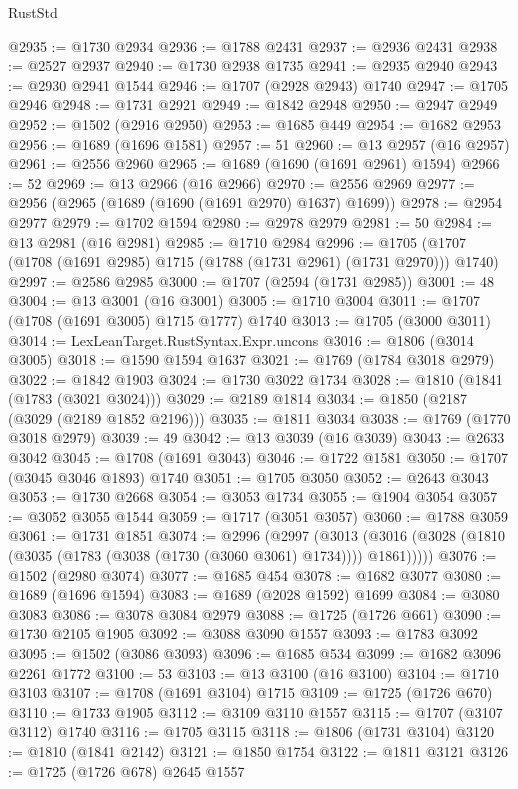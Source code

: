 \begin{lexlean}{RustStd}
\begin{coremodule}
@2935 := @1730 @2934
@2936 := @1788 @2431
@2937 := @2936 @2431
@2938 := @2527 @2937
@2940 := @1730 @2938 @1735
@2941 := @2935 @2940
@2943 := @2930 @2941 @1544
@2946 := @1707 (@2928 @2943) @1740
@2947 := @1705 @2946
@2948 := @1731 @2921
@2949 := @1842 @2948
@2950 := @2947 @2949
@2952 := @1502 (@2916 @2950)
@2953 := @1685 @449
@2954 := @1682 @2953
@2956 := @1689 (@1696 @1581)
@2957 := 51
@2960 := @13 @2957 (@16 @2957)
@2961 := @2556 @2960
@2965 := @1689 (@1690 (@1691 @2961) @1594)
@2966 := 52
@2969 := @13 @2966 (@16 @2966)
@2970 := @2556 @2969
@2977 := @2956 (@2965 (@1689 (@1690 (@1691 @2970) @1637) @1699))
@2978 := @2954 @2977
@2979 := @1702 @1594
@2980 := @2978 @2979
@2981 := 50
@2984 := @13 @2981 (@16 @2981)
@2985 := @1710 @2984
@2996 := @1705 (@1707 (@1708 (@1691 @2985) @1715 (@1788 (@1731 @2961) (@1731 @2970))) @1740)
@2997 := @2586 @2985
@3000 := @1707 (@2594 (@1731 @2985))
@3001 := 48
@3004 := @13 @3001 (@16 @3001)
@3005 := @1710 @3004
@3011 := @1707 (@1708 (@1691 @3005) @1715 @1777) @1740
@3013 := @1705 (@3000 @3011)
@3014 := LexLeanTarget.RustSyntax.Expr.uncons
@3016 := @1806 (@3014 @3005)
@3018 := @1590 @1594 @1637
@3021 := @1769 (@1784 @3018 @2979)
@3022 := @1842 @1903
@3024 := @1730 @3022 @1734
@3028 := @1810 (@1841 (@1783 (@3021 @3024)))
@3029 := @2189 @1814
@3034 := @1850 (@2187 (@3029 (@2189 @1852 @2196)))
@3035 := @1811 @3034
@3038 := @1769 (@1770 @3018 @2979)
@3039 := 49
@3042 := @13 @3039 (@16 @3039)
@3043 := @2633 @3042
@3045 := @1708 (@1691 @3043)
@3046 := @1722 @1581
@3050 := @1707 (@3045 @3046 @1893) @1740
@3051 := @1705 @3050
@3052 := @2643 @3043
@3053 := @1730 @2668
@3054 := @3053 @1734
@3055 := @1904 @3054
@3057 := @3052 @3055 @1544
@3059 := @1717 (@3051 @3057)
@3060 := @1788 @3059
@3061 := @1731 @1851
@3074 := @2996
    (@2997
      (@3013 (@3016 (@3028 (@1810 (@3035 (@1783 (@3038 (@1730 (@3060 @3061) @1734)))) @1861)))))
@3076 := @1502 (@2980 @3074)
@3077 := @1685 @454
@3078 := @1682 @3077
@3080 := @1689 (@1696 @1594)
@3083 := @1689 (@2028 @1592) @1699
@3084 := @3080 @3083
@3086 := @3078 @3084 @2979
@3088 := @1725 (@1726 @661)
@3090 := @1730 @2105 @1905
@3092 := @3088 @3090 @1557
@3093 := @1783 @3092
@3095 := @1502 (@3086 @3093)
@3096 := @1685 @534
@3099 := @1682 @3096 @2261 @1772
@3100 := 53
@3103 := @13 @3100 (@16 @3100)
@3104 := @1710 @3103
@3107 := @1708 (@1691 @3104) @1715
@3109 := @1725 (@1726 @670)
@3110 := @1733 @1905
@3112 := @3109 @3110 @1557
@3115 := @1707 (@3107 @3112) @1740
@3116 := @1705 @3115
@3118 := @1806 (@1731 @3104)
@3120 := @1810 (@1841 @2142)
@3121 := @1850 @1754
@3122 := @1811 @3121
@3126 := @1725 (@1726 @678) @2645 @1557

\end{coremodule}
\end{lexlean}
